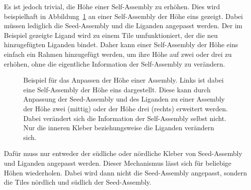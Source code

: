 Es ist jedoch trivial, die Höhe einer Self-Assembly zu erhöhen. Dies wird beispielhaft in Abbildung~\ref{fig:assembly_height} an einer Self-Assembly der Höhe eins gezeigt. Dabei müssen lediglich die Seed-Assembly und die Liganden angepasst werden. Der im Beispiel gezeigte Ligand wird zu einem Tile umfunktioniert, der die neu hinzugefügten Liganden bindet. Daher kann einer Self-Assembly der Höhe eins einfach ein Rahmen hinzugefügt werden, um ihre Höhe auf zwei oder drei zu erhöhen, ohne die eigentliche Information der Self-Assembly zu verändern.

\begin{figure}
    \centering 
    \caption[Beispiel zur Vergrößerung einer Assembly]{Beispiel für das Anpassen der Höhe einer Assembly. Links ist dabei eine Self-Assembly der Höhe eins dargestellt. Diese kann durch Anpassung der Seed-Assembly und des Liganden zu einer Assembly der Höhe zwei (mittig) oder der Höhe drei (rechts) erweitert werden. Dabei verändert sich die Information der Self-Assembly selbst nicht. Nur die inneren Kleber beziehungsweise die Liganden verändern sich.}
    \label{fig:assembly_height}
\end{figure}

Dafür muss nur entweder der südliche oder nördliche Kleber von Seed-Assembly und Liganden angepasst werden. Dieser Mechanismus lässt sich für beliebige Höhen wiederholen. Dabei wird dann nicht die Seed-Assembly angepasst, sondern die Tiles nördlich und südlich der Seed-Assembly.

